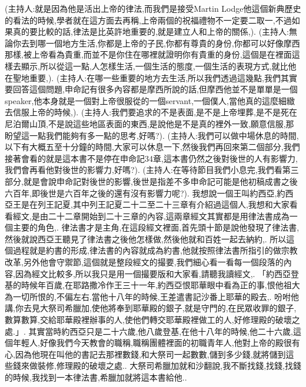 \documentclass{book}
\begin{document}
(主持人:就是因為他是活出上帝的律法,而我們是接受Martin Lodge他這個新典歷史的看法的時候,學者就在這方面去再稱,上帝兩個的祝福禮物不一定要二取一,不過如果真的要比較的話,律法是比英許地重要的,就是建立人和上帝的關係,).
(主持人:無論你去到哪一個地方生活,你都是上帝的子民,你都有尊貴的身份,你都可以好像摩西那樣,被上帝看為貴重,而並不是你住在哪裡就證明你有貴重的身份,這個是在裡面這樣去顯示,所以從這一點,人怎樣生活,一個生活的態度,一個生活的表現方式,就比他在聖地重要,).
(主持人:在哪一些重要的地方去生活,所以我們透過這幾點,我們其實要回答這個問題,申命記有很多內容都是摩西所說的話,但摩西他並不是單單是一個speaker,他本身就是一個對上帝很服從的一個servant,一個僕人,當他真的這麼細緻去信服上帝的時候,).
(主持人:我們要追求的不是表面,是不是上帝埋葬,是不是死在尼泊爾山頂,不是說這些地區表面的東西,是說他是不是真的裡外一致,願意信服,那盼望這一點我們能夠有多一點的思考,好嗎?).
(主持人:我們可以做中場休息的時間,以下有大概五至十分鐘的時間,大家可以休息一下,然後我們再回來第二個部分,我們接著會看的就是這本書不是停在申命記34章,這本書仍然之後對後世的人有影響力,我們會再看他對後世的影響力,好嗎?).
(主持人:在等待節目我們小息完,我們看第三部分,就是會說申命記對後世的影響,後世是指差不多申命記可能是他初稿成書之後六百年,即後世是六百年之後的還有沒有影響力呢?).
我想說一個王叫約西亞,約西亞王是在列王記夏,其中列王記夏二十二至二十三章有介紹過這個人,我想和大家看看經文,是由二十二章開始到二十三章的內容,這兩章經文其實都是用律法書成為一個主要的角色,.
律法書才是主角,在這段經文裡面,首先頭十節是說他發現了律法書,然後就說西亞王聽見了律法書之後他怎樣做,然後他就和百姓一起去納約,.
所以這個過程就是約書的形成,律法書的內容就成為約書,他就按照律法書所指引的做宗教改革,另外他會守禦節,這個就是整段經文的撮要,我們細心看一看每一個段落的內容,因為經文比較多,所以我只是用一個撮要版和大家看,請聽我讀經文,.
「約西亞登基的時候年百歲,在耶路撒冷作王三十一年,約西亞恨耶華眼中看為正的事,恨他祖大為一切所恨的,不偏左右.當他十八年的時候,王差遣書記沙番上耶華的殿去,.
吩咐他講,你去見大祭司希臘加,使他將奉到耶華殿的銀子,就是守門的,在民眾收罪的銀子,數算數算,交給耶華殿裡辦事的人,使他們轉交耶華殿裡做工的人,好修理殿的破壞之處.」.
其實當時約西亞只是二十六歲,他八歲登基,在他十八年的時候,他二十六歲,這個年輕人,好像我們今天教會的職稱,職稱團體裡面的初職青年人,他對上帝的殿很有心,因為他現在叫他的書記去那裡數錢,和大祭司一起數數,儲到多少錢,就將儲到這些錢來做裝修,修理殿的破壞之處..
大祭司希臘加就和沙翻說,我不斷找錢,找錢,找錢的時候,我找到一本律法書,希臘加就將這本書給他..
\end{document}
